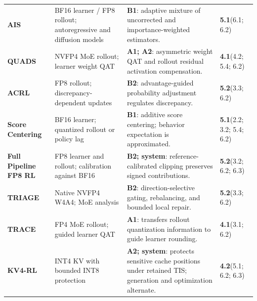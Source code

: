\begin{longtable}{@{}P{29mm}P{37mm}P{59mm}P{29mm}@{}}
\textbf{AIS} \citep{ais} & BF16 learner / FP8 rollout; autoregressive and diffusion models & \textbf{B1}: adaptive mixture of uncorrected and importance-weighted estimators. & \textbf{5.1}\newline(6.1; 6.2) \\[6pt]
\textbf{QUADS} \citep{quads} & NVFP4 MoE rollout; learner weight QAT & \textbf{A1; A2}: asymmetric weight QAT and rollout residual activation compensation. & \textbf{4.1}\newline(4.2; 5.4; 6.2) \\[6pt]
\textbf{ACRL} \citep{acrl} & FP8 rollout; discrepancy-dependent updates & \textbf{B2}: advantage-guided probability adjustment regulates discrepancy. & \textbf{5.2}\newline(3.3; 6.2) \\[6pt]
\textbf{Score Centering} \citep{score} & BF16 learner; quantized rollout or policy lag & \textbf{B1}: additive score centering; behavior expectation is approximated. & \textbf{5.1}\newline(2.2; 3.2; 5.4; 6.2) \\[6pt]
\textbf{Full Pipeline FP8 RL} \citep{fullfp8} & FP8 learner and rollout; calibration against BF16 & \textbf{B2; system}: reference-calibrated clipping preserves signed contributions. & \textbf{5.2}\newline(3.2; 6.2; 6.3) \\[6pt]
\textbf{TRIAGE} \citep{triage} & Native NVFP4 W4A4; MoE analysis & \textbf{B2}: direction-selective gating, rebalancing, and bounded local repair. & \textbf{5.2}\newline(3.3; 6.2) \\[6pt]
\textbf{TRACE} \citep{trace} & FP4 MoE rollout; guided learner QAT & \textbf{A1}: transfers rollout quantization information to guide learner rounding. & \textbf{4.1}\newline(3.1; 6.2) \\[6pt]
\textbf{KV4-RL} \citep{kv4} & INT4 KV with bounded INT8 protection & \textbf{A2; system}: protects sensitive cache positions under retained TIS; generation and optimization alternate. & \textbf{4.2}\newline(5.1; 6.2; 6.3) \\[6pt]

\end{longtable}
